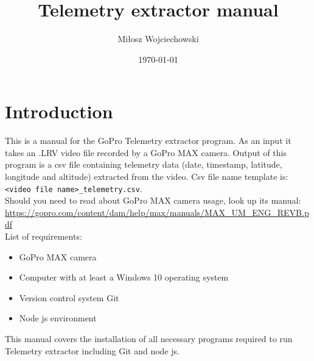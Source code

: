 \documentclass[a4paper,12pt]{book}
\begin{document}
\author{Miłosz Wojciechowski}
\title{Telemetry extractor manual}
\date{\today}


\maketitle
\pagebreak
{}
\renewcommand{\labelenumii}{\arabic{enumi}.\arabic{enumii}}
\tableofcontents
\chapter{Introduction}
This is a manual for the GoPro Telemetry extractor program. As an input it takes an .LRV video file recorded by a GoPro MAX camera. Output of this program is a csv file containing telemetry data (date, timestamp, latitude, longitude and altitude) extracted from the video. Csv file name template is: \verb|<video file name>_telemetry.csv|. \\

Should you need to read about GoPro MAX camera usage, look up its manual: \url{https://gopro.com/content/dam/help/max/manuals/MAX_UM_ENG_REVB.pdf} \\
List of requirements:
\begin{itemize}
	\item GoPro MAX camera
	\item Computer with at least a Windows 10 operating system
	\item Version control system Git
	\item Node js environment
\end{itemize}
This manual covers the installation of all necessary programs required to run Telemetry extractor including Git and node js.
\end{document}
